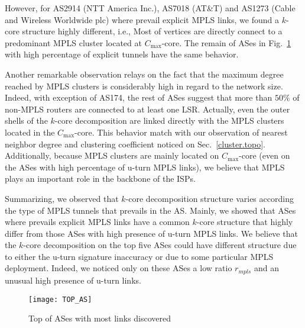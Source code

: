 However, for  AS2914 (NTT America Inc.), AS7018 (AT\&T) and AS1273 (Cable and
Wireless Worldwide plc) where prevail explicit MPLS links, we found a $k$-core
structure highly different, i.e., Most of vertices are directly connect to a predominant MPLS cluster
located at $C_{\max}$-core.
The remain of  ASes in Fig.~\ref{top_as} with high percentage of explicit tunnels have the same behavior.

Another remarkable observation  relays on the fact that the maximum degree
reached by MPLS clusters is considerably high in regard to the network
size. Indeed, with exception of AS174, the rest of ASes suggest that more than
$50\%$ of non-MPLS routers are connected  to at least one LSR. Actually, even
the outer shells of the $k$-core decomposition are linked directly with the
MPLS clusters located in the $C_{\max}$-core. This behavior match with
our observation of nearest neighbor degree and clustering coefficient noticed on
Sec.~\ref{cluster.topo}. Additionally, because MPLS clusters are
mainly located on $C_{\max}$-core (even on the ASes with high percentage of
u-turn MPLS links), we believe that MPLS plays an important role in the
backbone of the ISPs.

Summarizing, we observed that  $k$-core decomposition structure varies according
the type of MPLS tunnels that prevails in the AS. Mainly, we showed that ASes where prevails 
explicit MPLS links have a common $k$-core structure that highly differ from those ASes with
high presence of u-turn MPLS links. We believe that the $k$-core decomposition  on the top five ASes could have different structure due to either  the
u-turn signature inaccuracy or due to some particular MPLS deployment. Indeed, we noticed only on these
ASes a low ratio $r_{mpls}$ and an unusual  high presence of  u-turn links.


\begin{figure}[!htb]
  \begin{center}
    \texttt{[image: TOP\_AS]}
  \end{center}
  \caption{Top of ASes with most links discovered}
  \label{top_as}
\end{figure}

